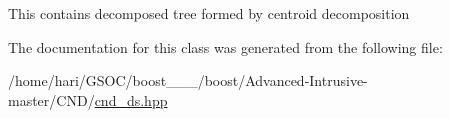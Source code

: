 This contains decomposed tree formed by centroid decomposition 

The documentation for this class was generated from the following file\+:\begin{DoxyCompactItemize}
\item 
/home/hari/\+G\+S\+O\+C/boost\+\_\+\_\+\_/boost/\+Advanced-\/\+Intrusive-\/master/\+C\+N\+D/\hyperlink{cnd__ds_8hpp}{cnd\+\_\+ds.\+hpp}\end{DoxyCompactItemize}
